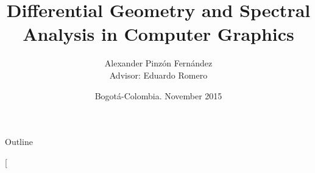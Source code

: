 \documentclass[10pt, compress, english]{beamer}
\makeatletter
\newcommand\makebeamertitle{\frame{\maketitle}}%
\let\origtableofcontents=\tableofcontents
\def\tableofcontents{\@ifnextchar[{\origtableofcontents}{\gobbletableofcontents}}
\def\gobbletableofcontents#1{\origtableofcontents}
\makeatother
\begin{document}
\title[cim@lab]{Differential Geometry and Spectral Analysis in Computer Graphics}


\author[Alexander Pinzón, Eduardo Romero]{Alexander Pinzón Fernández\\
{\footnotesize{}Advisor: Eduardo Romero}}


\date{Bogotá-Colombia. November 2015}

\makebeamertitle


\begin{frame}{Outline}

\tableofcontents{}

\end{frame}
\end{document}
